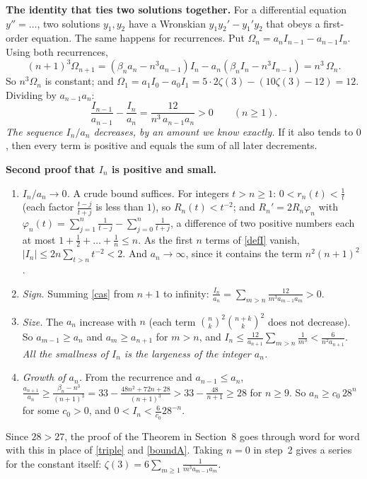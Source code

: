 \documentclass[11pt]{article}
\theoremstyle{remark}
\newcommand{\q}[1]{\medskip\noindent\textbf{#1}}
\begin{document}
\q{The identity that ties two solutions together.} For a differential equation $y''=\dots$, two
solutions $y_1,y_2$ have a Wronskian $y_1y_2'-y_1'y_2$ that obeys a first-order equation. The same
happens for recurrences. Put $\Omega_n=a_nI_{n-1}-a_{n-1}I_n$. Using both recurrences,
\[
(n+1)^3\Omega_{n+1}=(\beta_na_n-n^3a_{n-1})I_n-a_n(\beta_nI_n-n^3I_{n-1})=n^3\,\Omega_n .
\]
So $n^3\Omega_n$ is constant; and $\Omega_1=a_1I_0-a_0I_1=5\cdot2\zeta(3)-(10\zeta(3)-12)=12$.
Dividing by $a_{n-1}a_n$:
\begin{equation}\label{cas}
\frac{I_{n-1}}{a_{n-1}}-\frac{I_n}{a_n}=\frac{12}{n^3\,a_{n-1}a_n}>0\qquad(n\ge1).
\end{equation}
\emph{The sequence $I_n/a_n$ decreases, by an amount we know exactly.} If it also tends to $0$, then
every term is positive and equals the sum of all later decrements.

\q{Second proof that $I_n$ is positive and small.}
\begin{enumerate}
\item \emph{$I_n/a_n\to0$.} A crude bound suffices. For integers $t>n\ge1$: $0<r_n(t)<\frac1t$
(each factor $\frac{t-j}{t+j}$ is less than $1$), so $R_n(t)<t^{-2}$; and $R_n'=2R_n\varphi_n$ with
$\varphi_n(t)=\sum_{j=1}^n\frac1{t-j}-\sum_{j=0}^n\frac1{t+j}$, a difference of two positive numbers
each at most $1+\frac12+\dots+\frac1n\le n$. As the first $n$ terms of \eqref{defI} vanish,
$|I_n|\le2n\sum_{t>n}t^{-2}<2$. And $a_n\to\infty$, since it contains the term $n^2(n+1)^2$.
\item \emph{Sign.} Summing \eqref{cas} from $n+1$ to infinity:
$\displaystyle\frac{I_n}{a_n}=\sum_{m>n}\frac{12}{m^3a_{m-1}a_m}>0$.
\item \emph{Size.} The $a_n$ increase with $n$ (each term $\binom nk^2\binom{n+k}k^2$ does not
decrease). So $a_{m-1}\ge a_n$ and $a_m\ge a_{n+1}$ for $m>n$, and
$I_n\le\frac{12}{a_{n+1}}\sum_{m>n}\frac1{m^3}<\frac6{n^2a_{n+1}}$. \emph{All the smallness of $I_n$
is the largeness of the integer $a_n$.}
\item \emph{Growth of $a_n$.} From the recurrence and $a_{n-1}\le a_n$,
$\frac{a_{n+1}}{a_n}\ge\frac{\beta_n-n^3}{(n+1)^3}=33-\frac{48n^2+72n+28}{(n+1)^3}>33-\frac{48}{n+1}
\ge28$ for $n\ge9$. So $a_n\ge c_0\,28^n$ for some $c_0>0$, and $0<I_n<\frac6{c_0}28^{-n}$.
\end{enumerate}
Since $28>27$, the proof of the Theorem in Section~8 goes through word for word with this in place
of \eqref{triple} and \eqref{boundA}. Taking $n=0$ in step~2 gives a series for the constant itself:
$\zeta(3)=6\sum_{m\ge1}\frac1{m^3a_{m-1}a_m}$.
\end{document}
